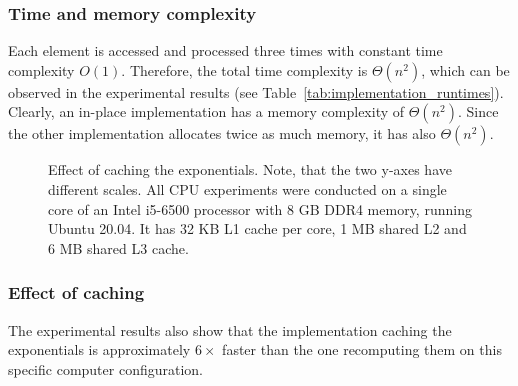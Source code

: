 \documentclass[conference]{IEEEtran}
\begin{document}
\subsubsection{\textbf{Time and memory complexity}}
Each element is accessed and processed three times with constant time complexity \(O(1)\). Therefore, the total time complexity is \(\Theta(n^2)\), which can be observed in the experimental results (see Table~\ref{tab:implementation_runtimes}). Clearly, an in-place implementation has a memory complexity of \(\Theta(n^2)\). Since the other implementation allocates twice as much memory, it has also \(\Theta(n^2)\).

\begin{figure}[t]
\centering
{}
\caption{Effect of caching the exponentials. Note, that the two y-axes have different scales. All CPU experiments were conducted on a single core of an Intel i5-6500 processor with 8 GB DDR4 memory, running Ubuntu 20.04. It has 32 KB L1 cache per core, 1 MB shared L2 and 6 MB shared L3 cache.}
\label{fig:softmax_cpu_caching}
\end{figure}

\subsubsection{\textbf{Effect of caching}}
The experimental results also show that the implementation caching the exponentials is approximately \(6\times\) faster than the one recomputing them on this specific computer configuration. 
\end{document}
